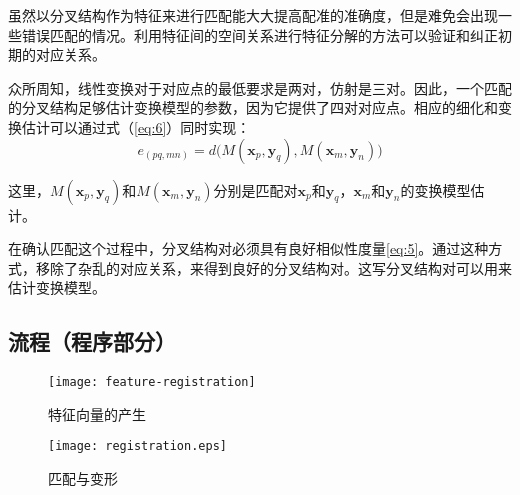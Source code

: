 \documentclass[a4paper,12pt]{article}
\begin{document}
虽然以分叉结构作为特征来进行匹配能大大提高配准的准确度，但是难免会出现一些错误匹配的情况。利用特征间的空间关系进行特征分解的方法可以验证和纠正初期的对应关系。

众所周知，线性变换对于对应点的最低要求是两对，仿射是三对。因此，一个匹配的分叉结构足够估计变换模型的参数，因为它提供了四对对应点。相应的细化和变换估计可以通过式（\ref{eq:6}）同时实现：
\begin{equation} 
\label{eq:6}
e_{(pq,mn)}=d\big(M(\boldsymbol{x}_p,\boldsymbol{y}_q),M(\boldsymbol{x}_m,\boldsymbol{y}_n)\big)
\end{equation}

这里，$M(\boldsymbol{x}_p,\boldsymbol{y}_q)$和$M(\boldsymbol{x}_m,\boldsymbol{y}_n)$分别是匹配对$\boldsymbol{x}_p$和$\boldsymbol{y}_q$，$\boldsymbol{x}_m$和$\boldsymbol{y}_n$的变换模型估计。

在确认匹配这个过程中，分叉结构对必须具有良好相似性度量\ref{eq:5}。通过这种方式，移除了杂乱的对应关系，来得到良好的分叉结构对。这写分叉结构对可以用来估计变换模型。



\subsection{流程（程序部分）}

\begin{figure}
\centering
\texttt{[image: feature-registration]}
\caption{特征向量的产生}
\label{fig:3}
\end{figure}

\begin{figure}
\centering
\texttt{[image: registration.eps]}
\caption{匹配与变形}
\label{fig:4}
\end{figure}






\newpage


\end{document}
